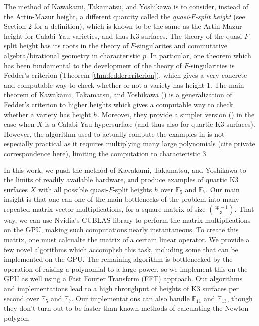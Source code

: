 The method of Kawakami, Takamatsu, and Yoshikawa is
to consider, instead of the Artin-Mazur height,
a different quantity called the
\textit{quasi-\(F\)-split height} 
(see Section 2 for a definition),
which is known to be the same as the Artin-Mazur height
for Calabi-Yau varieties, and thus K3 surfaces.
The theory of the quasi-\(F\)-split height has its
roots in the theory of \(F\)-singularites and commutative
algebra/birational geometry in characteristic \(p\).
In particular, one theorem which has been fundamental
to the development of the theory of \(F\)-singularities
is Fedder's criterion (Theorem \ref{thm:fedder:criterion}), 
which gives a very concrete and computable way to check
whether or not a variety has height \(1\).
The main theorem of Kawakami, Takamatsu, and Yoshikawa
(\cite[Theorem~A]{kty-2022-fedder})
is a generalization of Fedder's criterion
to higher heights which gives a 
computable way to check whether a variety has height \(h\).
Moreover, they provide a simpler version
(\cite[Theorem~C]{kty-2022-fedder})
in the case when \(X\) is a Calabi-Yau hypersurface
(and thus also for quartic K3 surfaces).
However, the algorithm used to actually compute the examples
in \cite{kty-2022-fedder} is not especially practical
as it requires multiplying many large polynomials
(cite private correspondence here),
limiting the computation 
to characteristic \(3\).

In this work, we push the method of Kawakami,
Takamatsu, and Yoshikawa to the limits of readily
available hardware, 
and produce examples of quartic K3 surfaces \(X\) with all
possible quasi-\(F\)-split heights \(h\) 
over \(\mathbb{F}_{5}\) and \(\mathbb{F}_{7}\).
Our main insight is that one can one of the main
bottlenecks of the problem into many repeated matrix-vector
multiplications, for a square matrix of size 
\(\binom{4p-1}{3}\).
That way, we can use Nvidia's CUBLAS library 
\cite{nvidia-2024-cublas}
to perform the matrix multiplications
on the GPU, making such computations
nearly instantaneous.
To create this matrix, one must calcualte the matrix of a
certain linear operator.
We provide a few novel algorithms which accomplish this task,
including some that can be implemented on the GPU.
The remaining algorithm is bottlenecked by the operation
of raising a polynomial to a large power, 
so we implement this on the GPU as well using 
a Fast Fourier Transform (FFT) approach.
Our algorithms and implementations lead to a high throughput
of heights of K3 surfaces per second over \(\mathbb{F}_{5}\) and
\(\mathbb{F}_{7}\).
Our implementations can also handle \(\mathbb{F}_{11}\) 
and \(\mathbb{F}_{13}\), though
they don't turn out to be faster than known methods of
calculating the Newton polygon.

